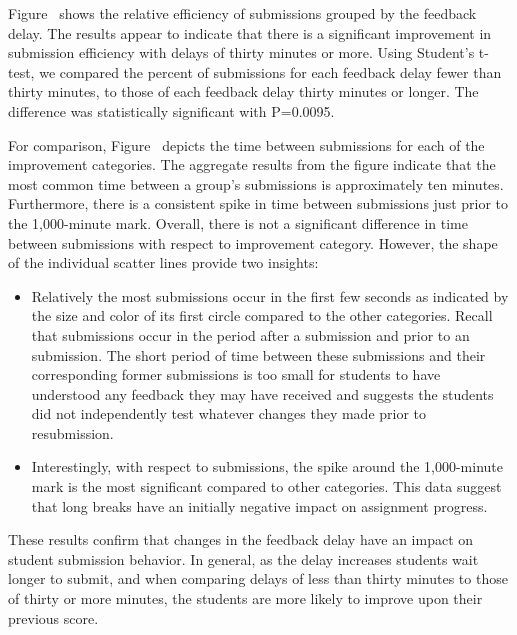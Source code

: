 Figure~ shows the relative efficiency of
submissions grouped by the feedback delay. The results appear to indicate that
there is a significant improvement in submission efficiency with delays of
thirty minutes or more. Using Student's t-test, we compared the percent of
\imp{} submissions for each feedback delay fewer than thirty minutes, to those
of each feedback delay thirty minutes or longer. The difference was
statistically significant with P=0.0095.

For comparison, Figure~ depicts the time between
submissions for each of the improvement categories. The aggregate results from
the figure indicate that the most common time between a group's submissions is
approximately ten minutes. Furthermore, there is a consistent spike in time
between submissions just prior to the 1,000-minute mark. Overall, there is not
a significant difference in time between submissions with respect to
improvement category. However, the shape of the individual scatter lines
provide two insights:

\begin{itemize}
\item Relatively the most \noii{} submissions occur in the first few seconds as
  indicated by the size and color of its first circle compared to the other
  categories. Recall that \noii{} submissions occur in the period after a
  \worse{} submission and prior to an \imp{} submission. The short period of
  time between these submissions and their corresponding former submissions is
  too small for students to have understood any feedback they may have received
  and suggests the students did not independently test whatever changes they
  made prior to resubmission.
\item Interestingly, with respect to \worse{} submissions, the spike around the
  1,000-minute mark is the most significant compared to other categories. This
  data suggest that long breaks have an initially negative impact on assignment
  progress.
\end{itemize}

These results confirm that changes in the feedback delay have an impact on
student submission behavior. In general, as the delay increases students wait
longer to submit, and when comparing delays of less than thirty minutes to
those of thirty or more minutes, the students are more likely to improve upon
their previous score.

